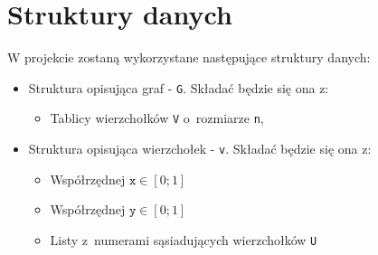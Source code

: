\section{Struktury danych}
	\label{projekt:struktury}


	\noindent W projekcie zostaną wykorzystane następujące struktury danych:
	\begin{itemize}
		\item Struktura opisująca graf - \texttt{G}. Składać będzie się ona z:
			\begin{itemize}
				\item Tablicy wierzchołków \texttt{V} o~rozmiarze \texttt{n},
				\end{itemize}

		\item Struktura opisująca wierzchołek - \texttt{v}. Składać będzie się ona z:
			\begin{itemize}
				\item Współrzędnej $\texttt{x} \in [0; 1]$
				\item Współrzędnej $\texttt{y} \in [0; 1]$
				\item Listy z~numerami sąsiadujących wierzchołków \texttt{U}
			\end{itemize}
	\end{itemize}
